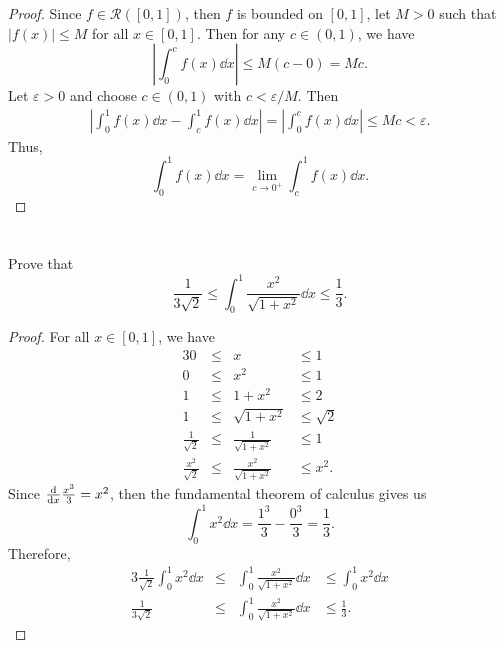 \documentclass[12pt]{article}
\newenvironment{problem}
    {\begin{lrbox}{\mybox}\begin{minipage}{0.98\textwidth}}
    {\end{minipage}\end{lrbox}\begin{center}\framebox[\textwidth]{\usebox{\mybox}}\end{center}}
\theoremstyle{definition}
\newcommand{\eps}{\varepsilon}
\begin{document}
\begin{proof}
    Since $f \in \mathcal{R}([0,1])$, then $f$ is bounded on $[0, 1]$, let $M >0$ such that $|f(x)| \leq M$ for all $x \in [0, 1]$. Then for any $c \in (0, 1)$, we have
    \[
        \left|\int_0^c f(x) \dd{x}\right| \leq M(c - 0) = Mc.
    \]
    Let $\eps > 0$ and choose $c \in (0, 1)$ with  $c < \eps/M$. Then
    \begin{align*}
        \left|\int_0^1 f(x) \dd{x} - \int_c^1 f(x) \dd{x}\right|
            = \left|\int_0^c f(x) \dd{x}\right|
            \leq Mc
            < \eps.
    \end{align*}
    Thus,
    \[
        \int_0^1f(x)  \dd{x} = \lim_{c\to 0^+} \int_c^1f(x)  \dd{x}.
    \]
    
\end{proof}

\newpage
\section{}
\begin{problem}
    Prove that 
    \begin{equation}
        \frac{1}{3\sqrt{2}}\le \int_0^1\frac{x^2}{\sqrt{1+x^2}}  \dd{x} \le \frac{1}{3}.
    \end{equation}
\end{problem}

\begin{proof}
    For all $x \in [0, 1]$, we have
    \begin{alignat*}{3}
        0 &\leq& x &\leq 1 \\
        0 &\leq& x^2 &\leq 1 \\
        1 &\leq& 1 + x^2 &\leq 2 \\
        1 &\leq& \sqrt{1 + x^2} &\leq \sqrt{2} \\
        \frac{1}{\sqrt{2}} &\leq& \frac{1}{\sqrt{1 + x^2}} &\leq 1 \\
        \frac{x^2}{\sqrt{2}} &\leq& \frac{x^2}{\sqrt{1 + x^2}} &\leq x^2.
    \end{alignat*}
    Since $\dv{x} \frac{x^3}{3} = x^2$, then the fundamental theorem of calculus gives us
    \[
        \int_0^1 x^2 \dd{x} = \frac{1^3}{3} - \frac{0^3}{3} = \frac13.
    \]
    Therefore,
    \begin{alignat*}{3}
        \frac{1}{\sqrt{2}}\int_0^1 x^2 \dd{x} &\leq& \int_0^1 \frac{x^2}{\sqrt{1 + x^2}} \dd{x} &\leq \int_0^1 x^2 \dd{x} \\
        \frac{1}{3\sqrt{2}} &\leq& \int_0^1 \frac{x^2}{\sqrt{1 + x^2}} \dd{x} &\leq \frac13.
    \end{alignat*}
    
    
\end{proof}
\end{document}
